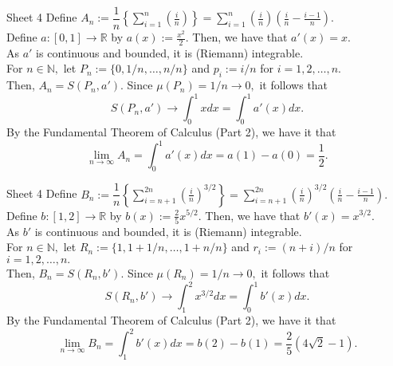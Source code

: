 \documentclass[handout, aspectratio=169]{beamer}
\begin{document}
\begin{frame}{Sheet 4}
	Define $A_n := \displaystyle\dfrac{1}{n}\left\{\sum_{i=1}^{n}\left(\frac{i}{n}\right)\right\} =\sum_{i=1}^{n}\left(\frac{i}{n}\right)\left(\frac{i}{n} - \frac{i-1}{n}\right).$\\
	Define $a:[0, 1] \to \mathbb{R}$ by $a(x) := \frac{x^2}{2}.$ Then, we have that $a'(x) = x.$\\
	As $a'$ is continuous and bounded, it is (Riemann) integrable. \\
	For $n \in \mathbb{N},$ let $P_n := \{0, 1/n, \ldots, n/n\}$ and $p_i := i/n$ for $i = 1, 2, \ldots, n.$\\
	Then, $A_n = S(P_n, a').$ Since $\mu(P_n) = 1/n \to 0,$ it follows that
	\[S(P_n, a') \to \int_{0}^{1} x dx = \int_{0}^{1} a'(x) dx. \]
	By the Fundamental Theorem of Calculus (Part 2), we have it that
	\[\lim_{n\to \infty}A_n = \int_{0}^{1} a'(x) dx = a(1) - a(0) = \dfrac{1}{2}.\]

\end{frame}

\begin{frame}{Sheet 4}
	Define $B_n := \displaystyle\dfrac{1}{n}\left\{\sum_{i=n+1}^{2n}\left(\frac{i}{n}\right)^{3/2}\right\} =\sum_{i=n+1}^{2n}\left(\frac{i}{n}\right)^{3/2}\left(\frac{i}{n} - \frac{i-1}{n}\right).$\\
	Define $b:[1, 2] \to \mathbb{R}$ by $b(x) := \frac{2}{5}x^{5/2}.$ Then, we have that $b'(x) = x^{3/2}.$\\
	As $b'$ is continuous and bounded, it is (Riemann) integrable. \\
	For $n \in \mathbb{N},$ let $R_n := \{1, 1+1/n, \ldots, 1+n/n\}$ and $r_i := (n+i)/n$ for $i = 1, 2, \ldots, n.$\\
	Then, $B_n = S(R_n, b').$ Since $\mu(R_n) = 1/n \to 0,$ it follows that
	\[S(R_n, b') \to \int_{1}^{2} x^{3/2} dx = \int_{0}^{1} b'(x) dx. \]
	By the Fundamental Theorem of Calculus (Part 2), we have it that
	\[\lim_{n\to \infty}B_n = \int_{1}^{2} b'(x) dx = b(2) - b(1) = \dfrac{2}{5}(4\sqrt{2} - 1).\]

\end{frame}
\end{document}
